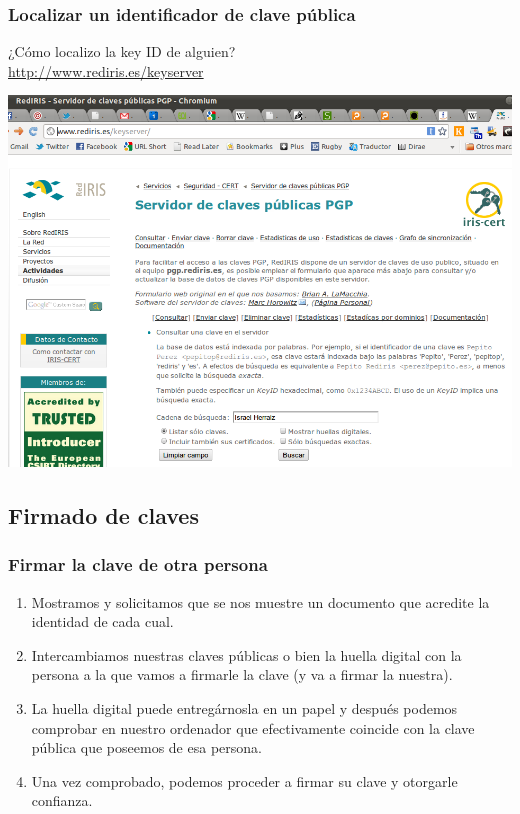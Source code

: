 \documentclass{beamer}
\begin{document}

\begin{frame}[fragile]
\frametitle{Localizar un identificador de clave pública}


¿Cómo localizo la \alert{key ID} de alguien? \\
\pause
\centering
\url{http://www.rediris.es/keyserver}

\medskip
\centering
\includegraphics[scale=0.35,clip=true]{figs/rediris.png}

\end{frame}



\subsection{Firmado de claves}
\begin{frame}
\frametitle{Firmar la clave de otra persona}

\begin{enumerate}
\item Mostramos y solicitamos que se nos muestre un documento que acredite la identidad de cada cual.
\item Intercambiamos nuestras claves públicas o bien la huella digital con la persona a la que vamos a firmarle la clave (y va a firmar la nuestra). 
\item La huella digital puede entregárnosla en un papel y después podemos comprobar en nuestro ordenador que efectivamente coincide con la clave pública que poseemos de esa persona.
\item Una vez comprobado, podemos proceder a firmar su clave y otorgarle confianza.
\end{enumerate}

\end{frame}
\end{document}

